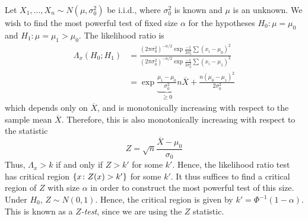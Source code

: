 \begin{example}
	Let \( X_1, \dots, X_n \sim N(\mu, \sigma_0^2) \) be i.i.d., where \( \sigma_0^2 \) is known and \( \mu \) is an unknown.
	We wish to find the most powerful test of fixed size \( \alpha \) for the hypotheses \( H_0 \colon \mu = \mu_0 \) and \( H_1 \colon \mu = \mu_1 > \mu_0 \).
	The likelihood ratio is
	\begin{align*}
		\Lambda_x(H_0;H_1) &= \frac{(2\pi \sigma_0^2)^{-n/2} \exp{\frac{-1}{2\sigma_0^2} \sum (x_i - \mu_0)^2}}{(2\pi \sigma_0^2)^{-n/2} \exp{\frac{-1}{2\sigma_0^2} \sum (x_i - \mu_1)^2}} \\
		&= \exp{\underbrace{\frac{\mu_1 - \mu_0}{\sigma_0^2}}_{\geq 0} n \overline X + \frac{n(\mu_0 - \mu_1)^2}{2\sigma_0^2}}
	\end{align*}
	which depends only on \( \overline X \), and is monotonically increasing with respect to the sample mean \( \overline X \).
	Therefore, this is also monotonically increasing with respect to the statistic
	\[ Z = \sqrt{n}\frac{\overline X - \mu_0}{\sigma_0} \]
	Thus, \( \Lambda_x > k \) if and only if \( Z > k' \) for some \( k' \).
	Hence, the likelihood ratio test has critical region \( \qty{x\colon Z(x) > k'} \) for some \( k' \).
	It thus suffices to find a critical region of \( Z \) with size \( \alpha \) in order to construct the most powerful test of this size.
	Under \( H_0 \), \( Z \sim N(0,1) \).
	Hence, the critical region is given by \( k' = \Phi^{-1}(1-\alpha) \).
	This is known as a \textit{\( Z \)-test}, since we are using the \( Z \) statistic.
\end{example}

